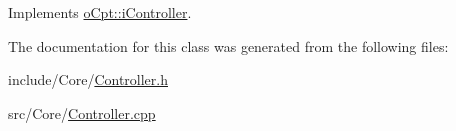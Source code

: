 Implements \hyperlink{classo_cpt_1_1i_controller_af414ebaf64b79ac45d1275e62799e36c}{o\+Cpt\+::i\+Controller}.



The documentation for this class was generated from the following files\+:\begin{DoxyCompactItemize}
\item 
include/\+Core/\hyperlink{_controller_8h}{Controller.\+h}\item 
src/\+Core/\hyperlink{_controller_8cpp}{Controller.\+cpp}\end{DoxyCompactItemize}
